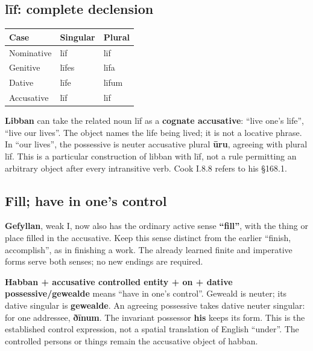 \subsection*{līf: complete declension}

\par\begingroup
\fontsize{10.5}{13.2}\selectfont
\setlength{\LTleft}{0pt}\setlength{\LTright}{\fill}
\noindent
\begin{tabular}{@{}>{\raggedright\arraybackslash}p{39.46mm}>{\raggedright\arraybackslash}p{39.46mm}>{\raggedright\arraybackslash}p{39.46mm}@{}}
\toprule
\textbf{Case} & \textbf{Singular} & \textbf{Plural} \\
\midrule
Nominative & līf & līf \\
Genitive & līfes & līfa \\
Dative & līfe & līfum \\
Accusative & līf & līf \\
\bottomrule
\end{tabular}
\par\endgroup

\textbf{Libban} can take the related noun līf as a \textbf{cognate accusative}: “live one’s life”, “live our lives”. The object names the life being lived; it is not a locative phrase. In “our lives”, the possessive is neuter accusative plural \textbf{ūru}, agreeing with plural līf. This is a particular construction of libban with līf, not a rule permitting an arbitrary object after every intransitive verb. Cook I.8.8 refers to his §168.1.

\subsection*{Fill; have in one’s control}

\textbf{Gefyllan}, weak I, now also has the ordinary active sense \textbf{“fill”}, with the thing or place filled in the accusative. Keep this sense distinct from the earlier “finish, accomplish”, as in finishing a work. The already learned finite and imperative forms serve both senses; no new endings are required.

\textbf{Habban + accusative controlled entity + on + dative possessive/\allowbreak{}gewealde} means “have in one’s control”. Geweald is neuter; its dative singular is \textbf{gewealde}. An agreeing possessive takes dative neuter singular: for one addressee, \textbf{ðīnum}. The invariant possessor \textbf{his} keeps its form. This is the established control expression, not a spatial translation of English “under”. The controlled persons or things remain the accusative object of habban.

